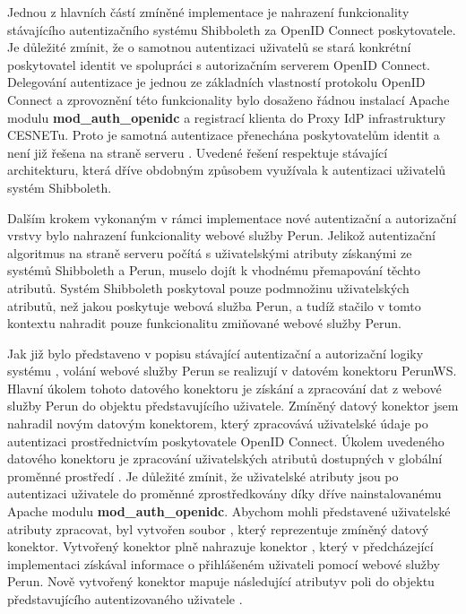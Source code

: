 \documentclass[
  printed, %
  twoside, %
  table,   %
  nolof,     %
  nolot,     %
]{fithesis3}
\begin{document}
Jednou z hlavních částí zmíněné implementace je nahrazení funkcionality stávajícího autentizačního systému Shibboleth za OpenID Connect poskytovatele.
Je důležité zmínit, že o samotnou autentizaci uživatelů se stará konkrétní poskytovatel identit ve spolupráci s autorizačním serverem OpenID Connect. Delegování autentizace je jednou ze základních vlastností protokolu OpenID Connect a zprovoznění této funkcionality bylo dosaženo řádnou instalací Apache modulu \textbf{mod\_auth\_openidc} a registrací klienta  do Proxy IdP infrastruktury CESNETu. Proto je samotná autentizace přenechána poskytovatelům identit a není již řešena na straně serveru . Uvedené řešení respektuje stávající architekturu, která dříve obdobným způsobem využívala k autentizaci uživatelů systém Shibboleth. 

\par 
Dalším krokem vykonaným v rámci implementace nové autentizační a autorizační vrstvy bylo nahrazení funkcionality webové služby Perun.  
Jelikož autentizační algoritmus na straně serveru  počítá s uživatelskými atributy získanými ze systémů Shibboleth a Perun, muselo dojít k vhodnému přemapování těchto atributů. Systém Shibboleth poskytoval pouze podmnožinu uživatelských atributů, než jakou poskytuje webová služba Perun, a tudíž stačilo v tomto kontextu nahradit pouze funkcionalitu zmiňované webové služby Perun. \par

Jak již bylo představeno v popisu stávající autentizační a autorizační logiky systému , volání webové služby Perun se realizují v datovém konektoru PerunWS. Hlavní úkolem tohoto datového konektoru je získání a zpracování dat z webové služby Perun do objektu představujícího uživatele. Zmíněný datový konektor jsem nahradil novým datovým konektorem, který zpracovává uživatelské údaje po autentizaci prostřednictvím poskytovatele OpenID Connect. Úkolem uvedeného datového konektoru je zpracování uživatelských atributů dostupných v globální proměnné prostředí . Je důležité zmínit, že uživatelské atributy jsou po autentizaci uživatele do proměnné  zprostředkovány díky dříve nainstalovanému Apache modulu \textbf{mod\_auth\_openidc}. Abychom mohli představené uživatelské atributy zpracovat, byl vytvořen soubor , který reprezentuje zmíněný datový konektor. Vytvořený konektor  plně nahrazuje konektor , který v předcházející implementaci získával informace o přihlášeném uživateli pomocí webové služby Perun. Nově vytvořený konektor mapuje následující atributy\break v poli  do objektu představujícího autentizovaného uživatele . 
\end{document}

